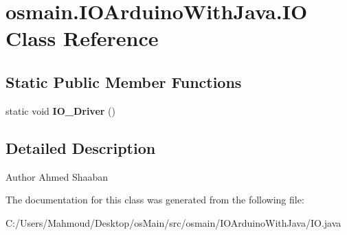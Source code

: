 \hypertarget{classosmain_1_1_i_o_arduino_with_java_1_1_i_o}{}\section{osmain.\+I\+O\+Arduino\+With\+Java.\+IO Class Reference}
\label{classosmain_1_1_i_o_arduino_with_java_1_1_i_o}
\subsection*{Static Public Member Functions}
\begin{DoxyCompactItemize}
\item 
static void {\bfseries I\+O\+\_\+\+Driver} ()\hypertarget{classosmain_1_1_i_o_arduino_with_java_1_1_i_o_a467abcd62a771d5fce623bf4a25828a9}{}\label{classosmain_1_1_i_o_arduino_with_java_1_1_i_o_a467abcd62a771d5fce623bf4a25828a9}

\end{DoxyCompactItemize}


\subsection{Detailed Description}
\begin{DoxyAuthor}{Author}
Ahmed Shaaban 
\end{DoxyAuthor}


The documentation for this class was generated from the following file\+:\begin{DoxyCompactItemize}
\item 
C\+:/\+Users/\+Mahmoud/\+Desktop/os\+Main/src/osmain/\+I\+O\+Arduino\+With\+Java/I\+O.\+java\end{DoxyCompactItemize}

